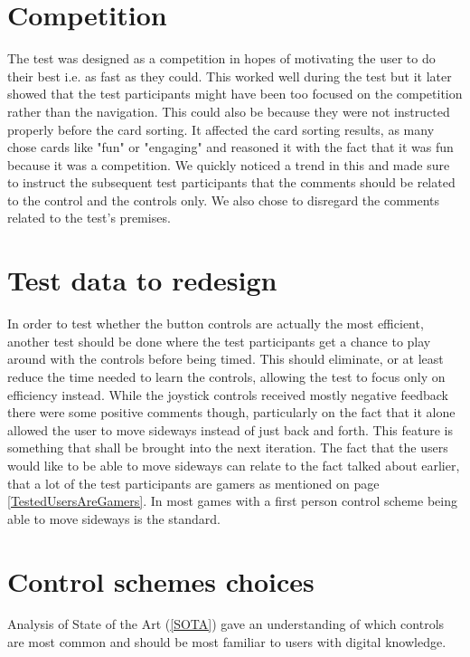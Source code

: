\section*{Competition}
The test was designed as a competition in hopes of motivating the user to do their best i.e. as fast as they could. This worked well during the test but it later showed that the test participants might have been too focused on the competition rather than the navigation. This could also be because they were not instructed properly before the card sorting. It affected the card sorting results, as many chose cards like "fun" or "engaging" and reasoned it with the fact that it was fun because it was a competition. 
We quickly noticed a trend in this and made sure to instruct the subsequent test participants that the comments should be related to the control and the controls only.
We also chose to disregard the comments related to the test's premises.

\section*{Test data to redesign}
In order to test whether the button controls are actually the most efficient, another test should be done where the test participants get a chance to play around with the controls before being timed. This should eliminate, or at least reduce the time needed to learn the controls, allowing the test to focus only on efficiency instead.
While the joystick controls received mostly negative feedback there were some positive comments though, particularly on the fact that it alone allowed the user to move sideways instead of just back and forth. This feature is something that shall be brought into the next iteration. The fact that the users would like to be able to move sideways can relate to the fact talked about earlier, that a lot of the test participants are gamers as mentioned on page \ref{TestedUsersAreGamers}. In most games with a first person control scheme being able to move sideways is the standard. 

\section*{Control schemes choices}
Analysis of State of the Art (\ref{SOTA}) gave an understanding of which controls are most common and should be most familiar to users with digital knowledge.

